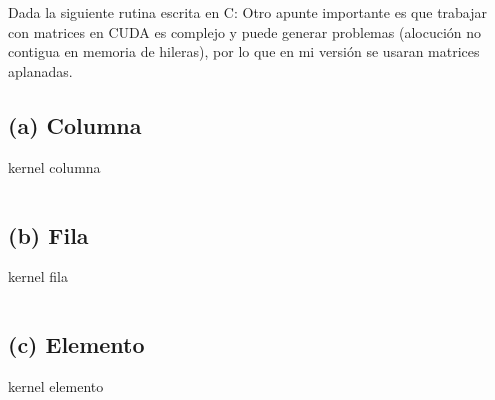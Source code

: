 \begin{pregunta}{Dada la siguiente rutina escrita en C:}
Otro apunte importante es que trabajar con matrices en CUDA es complejo y puede
generar problemas (alocución no contigua en memoria de hileras), por lo que en
mi versión se usaran matrices aplanadas.

\subsection*{(a) Columna}

\begin{listing}[H]
    \caption{kernel columna}
    \inputminted[firstline=18,lastline=28]{cuda}{code/main.cu}
    \label{lst:kernel-fila}
\end{listing}

\subsection*{(b) Fila}

\begin{listing}[H]
    \caption{kernel fila}
    \inputminted[firstline=30,lastline=38]{cuda}{code/main.cu}
    \label{lst:kernel-fila}
\end{listing}

\subsection*{(c) Elemento}

\begin{listing}[H]
    \caption{kernel elemento}
    \inputminted[firstline=45,lastline=54]{cuda}{code/main.cu}
    \label{lst:kernel-elemento}
\end{listing}


\end{pregunta}

